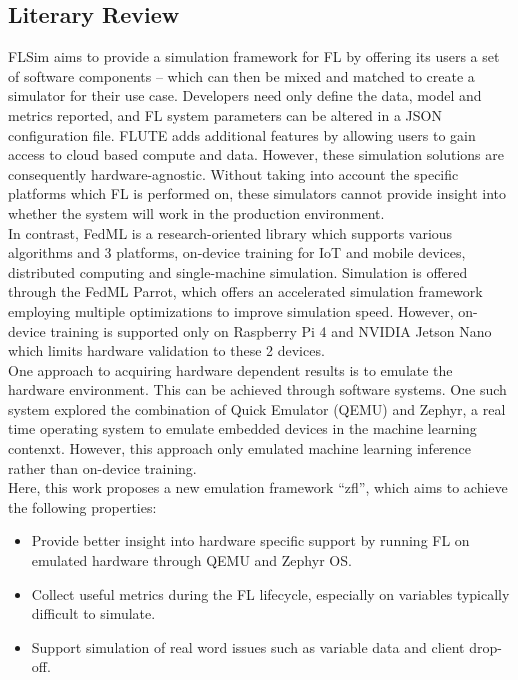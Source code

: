 \documentclass[12pt]{article}
\begin{document}
\subsection{Literary Review}
FLSim\cite{li_2021_flsim} aims to provide a simulation framework for FL by offering its users a set
of software components --
which can then be mixed and matched to create a simulator for their use case. Developers need only
define the data, model and metrics reported, and FL system parameters can be altered in a JSON
configuration file. FLUTE\cite{garcia_2022_flute} adds additional features by allowing users to gain access to cloud based
compute and data. However, these simulation solutions are consequently hardware-agnostic. Without
taking into account the specific platforms which FL is performed on, these simulators cannot provide
insight into whether the system will work in the production environment.\\

In contrast, FedML\cite{he_2020_fedml} is a research-oriented library which supports various algorithms and 3 platforms, on-device training for IoT and
mobile devices, distributed computing and single-machine simulation.
Simulation is offered through the FedML Parrot\cite{tang_2023_fedml}, which offers an accelerated simulation
framework employing multiple optimizations to improve simulation speed.
However, on-device training is supported only on Raspberry Pi 4 and NVIDIA Jetson Nano which limits
hardware validation to these 2 devices.\\

One approach to acquiring hardware dependent results is to emulate the hardware environment. This
can be achieved through software systems. One such system explored the combination of Quick Emulator (QEMU)
and Zephyr, a real time operating system to emulate embedded devices in the machine learning contenxt\cite{ntu}. However,
this approach only emulated machine learning inference rather than on-device training.\\

Here, this work proposes a new emulation framework ``zfl'', which aims to achieve the following
properties:
\begin{itemize}
  \item Provide better insight into hardware specific support by running FL on emulated hardware
    through QEMU and Zephyr OS.
  \item Collect useful metrics during the FL lifecycle, especially on variables typically difficult
    to simulate.
  \item Support simulation of real word issues such as variable data and client drop-off.
\end{itemize}
\end{document}
